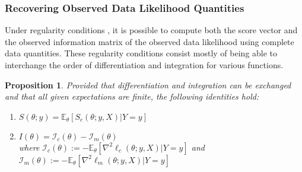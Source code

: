 \documentclass[ss]{imsart}
\theoremstyle{plain}
\newtheorem{proposition}{Proposition}[section]
\theoremstyle{definition}
\theoremstyle{remark}
\newcommand{\bE}{\mathbb{E}}
\begin{document}
\subsubsection{Recovering Observed Data Likelihood Quantities}

Under regularity conditions \citep[see][]{McL08}, it is possible to compute both the score vector and the observed information matrix of the observed data likelihood using complete data quantities. These regularity conditions consist mostly of being able to interchange the order of differentiation and integration for various functions.

\begin{proposition}
    \label{thm2:EM_decomp}
    Provided that differentiation and integration can be exchanged and that all given expectations are finite, the following identities hold:
    \begin{enumerate}[label=(\roman*)]
        \item $S(\theta; y) = \bE_\theta [S_c(\theta; y, X)|Y=y]$ \label{eq:obs_score_identity}
        \item $I(\theta) = \mathcal{I}_c(\theta) - \mathcal{I}_m(\theta)$ \label{eq:obs_info_identity}\\
        where $\mathcal{I}_c(\theta) := - \bE_\theta \left[ \nabla^2 \ell_c(\theta; y, X) | Y=y \right]$ and $\mathcal{I}_m(\theta) := - \bE_\theta \left[ \nabla^2 \ell_m(\theta; y, X) | Y=y \right]$
    \end{enumerate}
\end{proposition}
\end{document}
